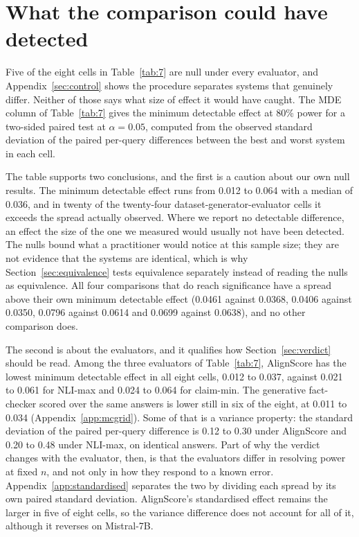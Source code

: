 \documentclass[11pt]{article}
\newcommand{\movedref}{Appendix}            %
\newcommand{\movedref}{Section}
\begin{document}
\section{What the comparison could have detected}
\label{app:power}

Five of the eight cells in Table~\ref{tab:7} are null under every evaluator, and \movedref~\ref{sec:control} shows the procedure separates systems that genuinely differ. Neither of those says what size of effect it would have caught. The MDE column of Table~\ref{tab:7} gives the minimum detectable effect at 80\% power for a two-sided paired test at $\alpha = 0.05$, computed from the observed standard deviation of the paired per-query differences between the best and worst system in each cell.

The table supports two conclusions, and the first is a caution about our own null results. The minimum detectable effect runs from 0.012 to 0.064 with a median of 0.036, and in twenty of the twenty-four dataset-generator-evaluator cells it exceeds the spread actually observed. Where we report no detectable difference, an effect the size of the one we measured would usually not have been detected. The nulls bound what a practitioner would notice at this sample size; they are not evidence that the systems are identical, which is why Section~\ref{sec:equivalence} tests equivalence separately instead of reading the nulls as equivalence. All four comparisons that do reach significance have a spread above their own minimum detectable effect (0.0461 against 0.0368, 0.0406 against 0.0350, 0.0796 against 0.0614 and 0.0699 against 0.0638), and no other comparison does.

The second is about the evaluators, and it qualifies how Section~\ref{sec:verdict} should be read. Among the three evaluators of Table~\ref{tab:7}, AlignScore has the lowest minimum detectable effect in all eight cells, 0.012 to 0.037, against 0.021 to 0.061 for NLI-max and 0.024 to 0.064 for claim-min. The generative fact-checker scored over the same answers is lower still in six of the eight, at 0.011 to 0.034 (Appendix~\ref{app:mcgrid}). Some of that is a variance property: the standard deviation of the paired per-query difference is 0.12 to 0.30 under AlignScore and 0.20 to 0.48 under NLI-max, on identical answers. Part of why the verdict changes with the evaluator, then, is that the evaluators differ in resolving power at fixed $n$, and not only in how they respond to a known error. Appendix~\ref{app:standardised} separates the two by dividing each spread by its own paired standard deviation. AlignScore's standardised effect remains the larger in five of eight cells, so the variance difference does not account for all of it, although it reverses on Mistral-7B.
\end{document}
